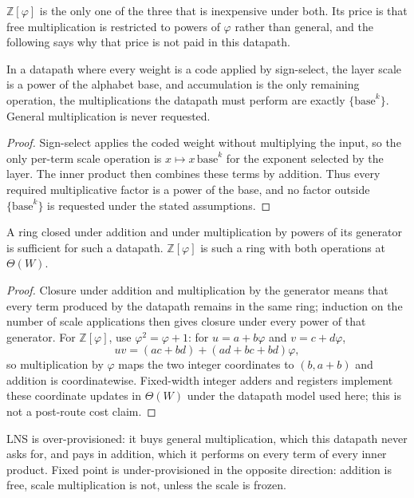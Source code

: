 $\mathbb{Z}[\varphi]$ is the only one of the three that is inexpensive under both.
Its price is that free
multiplication is restricted to powers of $\varphi$ rather than general, and the
following says why that price is not paid in this datapath.

\begin{theorem}
\label{thm:reqmul}
In a datapath where every weight is a code applied by sign-select, the layer
scale is a power of the alphabet base, and accumulation is the only remaining
operation, the multiplications the datapath must perform are exactly
$\{\text{base}^{k}\}$. General multiplication is never requested.
\end{theorem}
\begin{proof}
Sign-select applies the coded weight without multiplying the input, so the only
per-term scale operation is $x\mapsto x\,\text{base}^{k}$ for the exponent
selected by the layer.  The inner product then combines these terms by
addition.  Thus every required multiplicative factor is a power of the base,
and no factor outside $\{\text{base}^{k}\}$ is requested under the stated
assumptions.
\end{proof}

\begin{corollary}[Sufficiency]
\label{cor:sufficiency}
A ring closed under addition and under multiplication by powers of its generator
is sufficient for such a datapath. $\mathbb{Z}[\varphi]$ is such a ring with both
operations at $\Theta(W)$.
\end{corollary}
\begin{proof}
Closure under addition and multiplication by the generator means that every
term produced by the datapath remains in the same ring; induction on the number
of scale applications then gives closure under every power of that generator.
For $\mathbb{Z}[\varphi]$, use $\varphi^2=\varphi+1$: for
$u=a+b\varphi$ and $v=c+d\varphi$,
\[
 uv=(ac+bd)+(ad+bc+bd)\varphi,
\]
so multiplication by $\varphi$ maps the two integer coordinates to
$(b,a+b)$ and addition is coordinatewise.  Fixed-width integer adders and
registers implement these coordinate updates in $\Theta(W)$ under the
datapath model used here; this is not a post-route cost claim.
\end{proof}

\begin{corollary}
\label{cor:misprov}
LNS is over-provisioned: it buys general multiplication, which this datapath
never asks for, and pays in addition, which it performs on every term of every
inner product. Fixed point is under-provisioned in the opposite direction:
addition is free, scale multiplication is not, unless the scale is frozen.
\end{corollary}

